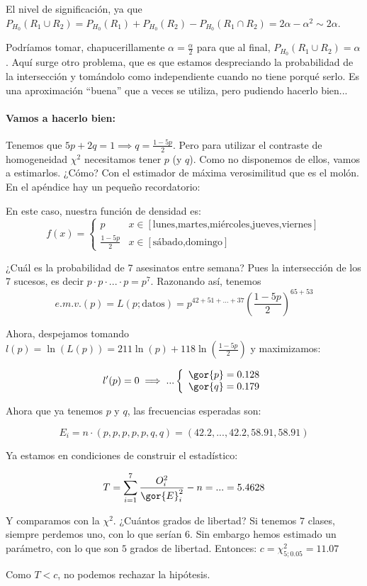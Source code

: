 \begin{problem}[4]
El nivel de significación, ya que $P_{H_0}(R_1 \cup R_2) = P_{H_0}(R_1) + P_{H_0}(R_2) - P_{H_0}(R_1\cap R_2) = 2α - α^2 \sim 2α$. 

Podríamos tomar, chapucerillamente $α = \frac{α}{2}$ para que al final, $P_{H_0} ( R_1 \cup R_2) = α$. Aquí surge otro problema, que es que estamos despreciando la probabilidad de la intersección y tomándolo como independiente cuando no tiene porqué serlo. Es una aproximación ``buena'' que a veces se utiliza, pero pudiendo hacerlo bien... \paragraph{Vamos a hacerlo bien:}



Tenemos que $5p + 2q = 1 \implies q = \frac{1-5p}{2}$. Pero para utilizar el contraste de homogeneidad $\chi^2$ necesitamos tener $p$ (y $q$). Como no disponemos de ellos, vamos a estimarlos. ¿Cómo? Con el estimador de máxima verosimilitud que es el molón. En el apéndice hay un pequeño recordatorio: 

En este caso, nuestra función de densidad es: \[f(x) = \left\{ \begin{array}{cl} p & x∈[\text{lunes,martes,miércoles,jueves,viernes}]\\\frac{1-5p}{2}&x∈[\text{sábado,domingo}] \end{array}\right.\]

¿Cuál es la probabilidad de 7 asesinatos entre semana? Pues la intersección de los 7 sucesos, es decir $p·p·...·p = p^7$. Razonando así, tenemos \[ e.m.v.(p) =L(p;\text{datos})= p^{42+51+...+37} \left( \frac{1-5p}{2} \right)^{65+53} \]

Ahora, despejamos tomando $l(p) = \ln(L(p)) = 211 \ln(p) + 118\ln\left(\frac{1-5p}{2}\right)$ y maximizamos:

\[
l'(p) = 0 \implies ... \left\{\begin{array}{c} \gor{p} = 0.128\\ \gor{q} = 0.179 \end{array}\right.
\]


Ahora que ya tenemos $p$ y $q$, las frecuencias esperadas son:

\[E_i = n·\left( p,p,p,p,p,q,q\right) = (42.2,...,42.2,58.91,58.91)\]
 
Ya estamos en condiciones de construir el estadístico:

\[
T = \sum_{i=1}^7 \frac{O_i^2}{\gor{E}_i^2} - n = ... = 5.4628
\]

Y comparamos con la $\chi^2$. ¿Cuántos grados de libertad? Si tenemos $7$ clases, siempre perdemos uno, con lo que serían 6. Sin embargo hemos estimado un parámetro, con lo que son $5$ grados de libertad. Entonces: $ c = \chi^2_{5;0.05} = 11.07$

Como $T < c$, no podemos rechazar la hipótesis.



\end{problem}



